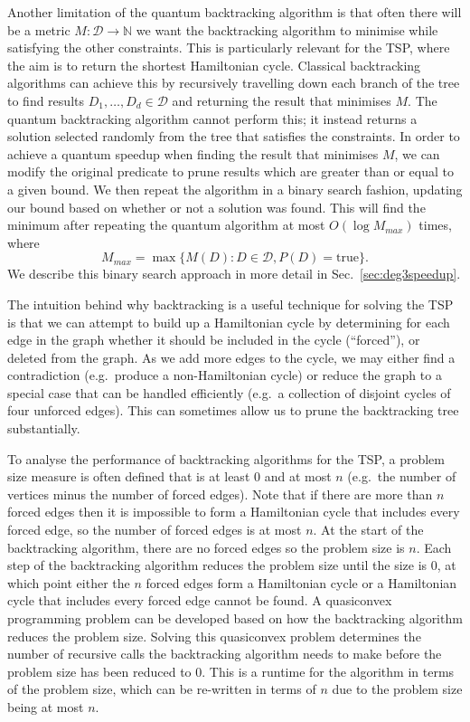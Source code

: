 Another limitation of the quantum backtracking algorithm is that often there will be a metric $M \colon \mathcal{D} \rightarrow \mathbb{N}$ we want the backtracking algorithm to minimise while satisfying the other constraints. This is particularly relevant for the TSP, where the aim is to return the shortest Hamiltonian cycle. Classical backtracking algorithms can achieve this by recursively travelling down each branch of the tree to find results $D_1,\dots,D_d \in \mathcal{D}$ and returning the result that minimises $M$. The quantum backtracking algorithm cannot perform this; it instead returns a solution selected randomly from the tree that satisfies the constraints. In order to achieve a quantum speedup when finding the result that minimises $M$, we can modify the original predicate to prune results which are greater than or equal to a given bound. We then repeat the algorithm in a binary search fashion, updating our bound based on whether or not a solution was found. This will find the minimum after repeating the quantum algorithm at most $O(\log M_{max})$ times, where
%
\begin{equation}
M_{max} = \max\{M(D):D\in \mathcal{D}, P(D) = \text{true}\}.
\end{equation}
%
We describe this binary search approach in more detail in Sec.\ \ref{sec:deg3speedup}.

The intuition behind why backtracking is a useful technique for solving the TSP is that we can attempt to build up a Hamiltonian cycle by determining for each edge in the graph whether it should be included in the cycle (``forced''), or deleted from the graph. As we add more edges to the cycle, we may either find a contradiction (e.g.\ produce a non-Hamiltonian cycle) or reduce the graph to a special case that can be handled efficiently (e.g.\ a collection of disjoint cycles of four unforced edges). This can sometimes allow us to prune the backtracking tree substantially.

To analyse the performance of backtracking algorithms for the TSP, a problem size measure is often defined that is at least 0 and at most $n$ (e.g.\ the number of vertices minus the number of forced edges). Note that if there are more than $n$ forced edges then it is impossible to form a Hamiltonian cycle that includes every forced edge, so the number of forced edges is at most $n$. At the start of the backtracking algorithm, there are no forced edges so the problem size is $n$. Each step of the backtracking algorithm reduces the problem size until the size is $0$, at which point either the $n$ forced edges form a Hamiltonian cycle or a Hamiltonian cycle that includes every forced edge cannot be found. A quasiconvex programming problem can be developed based on how the backtracking algorithm reduces the problem size. Solving this quasiconvex problem determines the number of recursive calls the backtracking algorithm needs to make before the problem size has been reduced to $0$. This is a runtime for the algorithm in terms of the problem size, which can be re-written in terms of $n$ due to the problem size being at most $n$.

